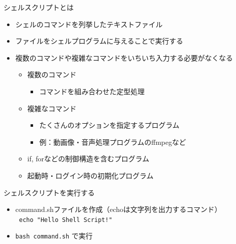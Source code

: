 \documentclass[12pt,aspectratio=169]{beamer}
\begin{document}
\begin{frame}{シェルスクリプトとは}
  \begin{itemize}
    \item シェルのコマンドを列挙したテキストファイル
    \item ファイルをシェルプログラムに与えることで実行する
    \item 複数のコマンドや複雑なコマンドをいちいち入力する必要がなくなる
      \begin{itemize}
        \item 複数のコマンド
          \begin{itemize}
            \item コマンドを組み合わせた定型処理
          \end{itemize}
        \item 複雑なコマンド
          \begin{itemize}
            \item たくさんのオプションを指定するプログラム
            \item 例：動画像・音声処理プログラムのffmpegなど
          \end{itemize}
        \item if, forなどの制御構造を含むプログラム
        \item 起動時・ログイン時の初期化プログラム
      \end{itemize}
  \end{itemize}

\end{frame}


\begin{frame}{シェルスクリプトを実行する}
  \begin{itemize}
    \item command.shファイルを作成（echoは文字列を出力するコマンド） \\
      \texttt {
        echo "Hello Shell Script!"
      }
    \item \texttt{bash command.sh} で実行
  \end{itemize}


\end{frame}
\end{document}
